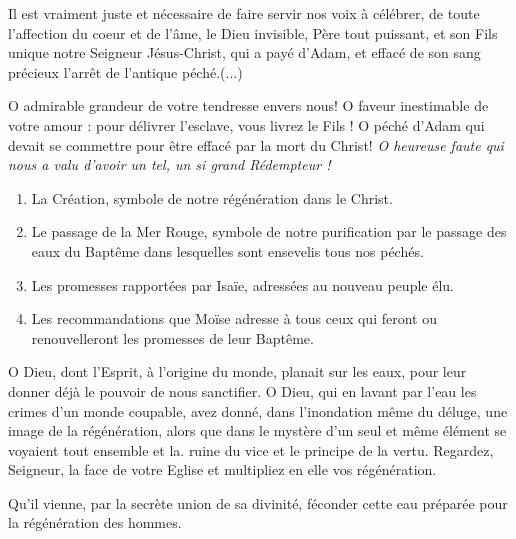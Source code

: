 \documentclass[%
fontsize=11%
,a5paper%
,DIV=15%
]{scrartcl}
\begin{document}

Il est vraiment juste et nécessaire
de faire servir nos voix à célébrer,
de toute l'affection du coeur et de
l'âme, le Dieu invisible, Père tout puissant,
et son Fils unique notre Seigneur Jésus-Christ, qui a payé d'Adam, et effacé de son sang précieux l'arrêt de l'antique péché.(...)

O admirable grandeur de votre tendresse envers nous! O faveur inestimable de votre
amour : pour délivrer l'esclave, vous livrez le Fils !
O péché d'Adam qui devait se commettre pour être effacé par la mort du Christ!
\emph{O heureuse faute qui nous a valu d'avoir un tel, un si grand Rédempteur !}



\begin{enumerate}
\item{La Création, symbole de notre régénération dans le Christ.}
\item{Le passage de la Mer Rouge, symbole de notre purification par le passage des eaux du Baptême dans lesquelles sont ensevelis tous nos péchés.}
\item{Les promesses rapportées par Isaïe, adressées au nouveau peuple élu.}
\item{Les recommandations que Moïse adresse à tous ceux qui feront ou renouvelleront les promesses de leur Baptême.}
\end{enumerate}




O Dieu, dont l'Esprit, à l'origine du
monde, planait sur les eaux, pour
leur donner déjà le pouvoir de nous
sanctifier. O Dieu, qui en lavant
par l'eau les crimes d'un monde coupable, avez donné, dans l'inondation
même du déluge, une image de la
régénération, alors que dans le mystère d'un seul et même élément se voyaient tout ensemble et la. ruine
du vice et le principe de la vertu.
Regardez, Seigneur, la face de votre
Eglise et multipliez en elle vos régénération.


Qu'il vienne, par la secrète union de sa divinité, féconder cette eau préparée pour la régénération des hommes.
\end{document}
